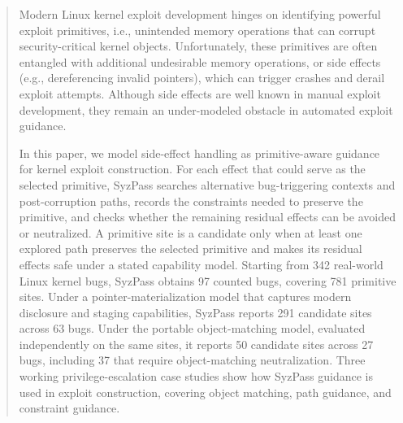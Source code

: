 \documentclass[conference]{IEEEtran}
\begin{document}
\begin{abstract}
Modern Linux kernel exploit development hinges on identifying powerful exploit primitives, i.e., unintended memory operations that can corrupt security-critical kernel objects. Unfortunately, these primitives are often entangled with additional undesirable memory operations, or side effects (e.g., dereferencing invalid pointers), which can trigger crashes and derail exploit attempts. Although side effects are well known in manual exploit development, they remain an under-modeled obstacle in automated exploit guidance.

In this paper, we model side-effect handling as primitive-aware guidance for kernel exploit construction. For each effect that could serve as the selected primitive, SyzPass searches alternative bug-triggering contexts and post-corruption paths, records the constraints needed to preserve the primitive, and checks whether the remaining residual effects can be avoided or neutralized. A primitive site is a candidate only when at least one explored path preserves the selected primitive and makes its residual effects safe under a stated capability model. Starting from 342 real-world Linux kernel bugs, SyzPass obtains 97 counted bugs, covering 781 primitive sites. Under a pointer-materialization model that captures modern disclosure and staging capabilities, SyzPass reports 291 candidate sites across 63 bugs. Under the portable object-matching model, evaluated independently on the same sites, it reports 50 candidate sites across 27 bugs, including 37 that require object-matching neutralization. Three working privilege-escalation case studies show how SyzPass guidance is used in exploit construction, covering object matching, path guidance, and constraint guidance.

\end{abstract}
\IEEEpeerreviewmaketitle










\cleardoublepage



\end{document}

